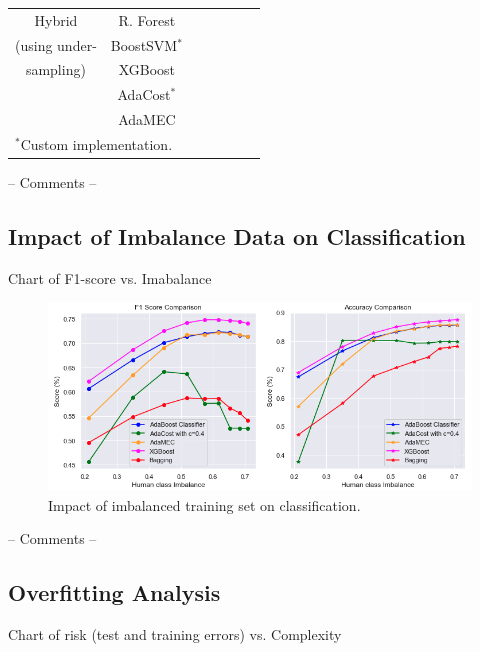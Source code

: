 \documentclass[conference]{IEEEtran}
\begin{document}
\begin{table}[htbp]
\begin{center}
\begin{tabular}{|c|c|c|c|c|c|c|}
Hybrid & R. Forest & & & & &  \\
\cline{2-7} 

(using under-& BoostSVM$^*$ & & & & &  \\
\cline{2-7} 

sampling)& XGBoost & & & & &  \\
\cline{2-7} 

 & AdaCost$^*$ & & & & &  \\
\cline{2-7} 

& AdaMEC & & & & &  \\
\hline

\multicolumn{4}{l}{$^{\mathrm{*}}$Custom implementation.}

\end{tabular}

\label{tab1}
\end{center}
\end{table}

-- Comments --

\subsection{Impact of Imbalance Data on Classification}

Chart of F1-score vs. Imabalance

\begin{figure}[htbp]
\centerline{\includegraphics[scale=0.35]{pictures/Imbalance_Comparison1.png}}
\caption{Impact of imbalanced training set on classification.}
\label{ImbalanceComparison}
\end{figure}

-- Comments --

\subsection{Overfitting Analysis}

Chart of risk (test and training errors) vs. Complexity
\end{document}
